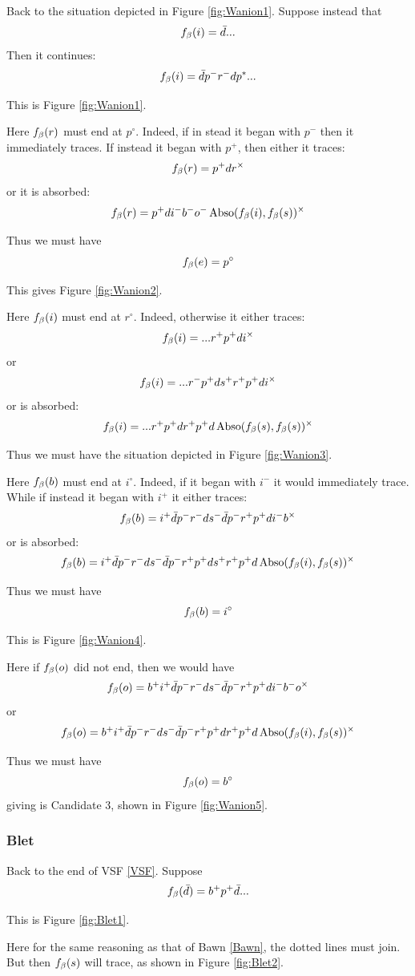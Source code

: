 \label{Wanion}
Back to the situation depicted in Figure \ref{fig:Wanion1}. Suppose instead that 
\[
f_\beta(i) = \bar{d}...
\]
Then it continues:
\[
f_\beta(i) = \bar{d} p^- r^- d p^*...
\]

This is Figure \ref{fig:Wanion1}.

Here $f_\beta(r)$ must end at $p^\circ$. Indeed, if in stead it began with $p^-$ then it immediately traces. If instead it began with $p^+$, then either it traces:
\[
f_\beta(r) = p^+ d r^\times
\]
or it is absorbed:
\[
f_\beta(r) = p^+ d i^- b^- o^- \operatorname{Abso}(f_\beta(i), f_\beta(s))^\times
\]

Thus we must have
\[
f_\beta(e) = p^\circ
\]

This gives Figure \ref{fig:Wanion2}.

Here $f_\beta(i)$ must end at $r^\circ$. Indeed, otherwise it either traces:
\[
f_\beta(i) = ...r^+ p^+ d i^\times
\]
or
\[
f_\beta(i) = ...r^- p^+ d s^+ r^+ p^+ d i^\times
\]
or is absorbed:
\[
f_\beta(i) = ...r^+ p^+ d r^+ p^+ d \operatorname{Abso}(f_\beta(s), f_\beta(s))^\times
\]

Thus we must have the situation depicted in Figure \ref{fig:Wanion3}. 

Here $f_\beta(b)$ must end at $i^\circ$. Indeed, if it began with $i^-$ it would immediately trace. While if instead it began with $i^+$ it either traces:
\[
f_\beta(b) = i^+ \bar{d} p^- r^- d s^- \bar{d} p^- r^+ p^+ d i^- b^\times
\]
or is absorbed:
\[
f_\beta(b) = i^+ \bar{d} p^- r^- d s^- \bar{d} p^- r^+ p^+ d s^+ r^+ p^+ d \operatorname{Abso}(f_\beta(i), f_\beta(s))^\times
\]

Thus we must have
\[
f_\beta(b) = i^\circ
\]

This is Figure \ref{fig:Wanion4}.

Here if $f_\beta(o)$ did not end, then we would have
\[
f_\beta(o) = b^+ i^+ \bar{d} p^- r^- d s^- \bar{d} p^- r^+ p^+ d i^- b^- o^\times
\]
or
\[
f_\beta(o) = b^+ i^+ \bar{d} p^- r^- d s^- \bar{d} p^- r^+ p^+ d r^+ p^+ d \operatorname{Abso}(f_\beta(i), f_\beta(s))^\times
\]

Thus we must have
\[
f_\beta(o) = b^\circ
\]
giving is Candidate 3, shown in Figure \ref{fig:Wanion5}.

\subsubsection{Blet}\label{Blet}
Back to the end of VSF \ref{VSF}. Suppose
\[
f_\beta(\bar{d}) = b^+ p^+ \bar{d}...
\]

This is Figure \ref{fig:Blet1}.

Here for the same reasoning as that of Bawn \ref{Bawn}, the dotted lines must join. But then $f_\beta(s)$ will trace, as shown in Figure \ref{fig:Blet2}.

